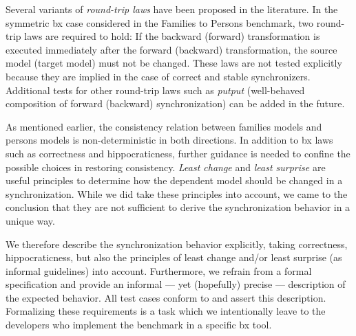
Several variants of \emph{round-trip laws} have been proposed in the literature. In the symmetric bx case considered in the Families to Persons benchmark, two round-trip laws are required to hold: If the backward (forward) transformation is executed immediately after the forward (backward) transformation, the source model (target model) must not be changed. These laws are not tested explicitly because they are implied in the case of correct and stable synchronizers.
Additional tests for other round-trip laws such as \emph{putput} (well-behaved composition of forward (backward) synchronization) can be added in the future.

As mentioned earlier, the consistency relation between families models and persons models is non-de\-ter\-min\-istic in both directions.
In addition to bx laws such as correctness and hippocraticness, further guidance is needed to confine the possible choices in restoring consistency.
\emph{Least change} and \emph{least surprise} are useful principles to determine how the dependent model should be changed in a synchronization.
While we did take these principles into account, we came to the conclusion that they are not sufficient to derive the synchronization behavior in a unique way. 

We therefore describe the synchronization behavior explicitly, taking correctness, hippocraticness, but also the principles of least change and/or least surprise (as informal guidelines) into account. Furthermore, we refrain from a formal specification and provide an informal --- yet (hopefully) precise --- description of the expected behavior.
All test cases conform to and assert this description.
Formalizing these requirements is a task which we intentionally leave to the developers who implement the benchmark in a specific bx tool. 




